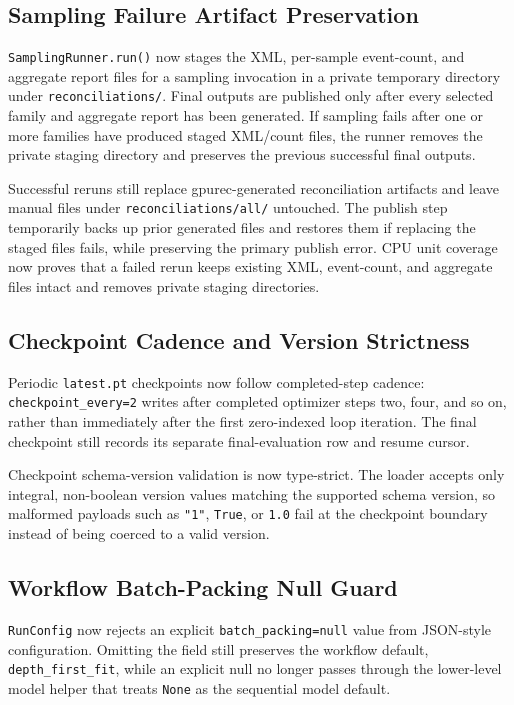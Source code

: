 \documentclass[11pt]{article}
\begin{document}
\subsection{Sampling Failure Artifact Preservation}

\texttt{SamplingRunner.run()} now stages the XML, per-sample event-count, and
aggregate report files for a sampling invocation in a private temporary
directory under \texttt{reconciliations/}.  Final outputs are published only
after every selected family and aggregate report has been generated.  If
sampling fails after one or more families have produced staged XML/count files,
the runner removes the private staging directory and preserves the previous
successful final outputs.

Successful reruns still replace gpurec-generated reconciliation artifacts and
leave manual files under \texttt{reconciliations/all/} untouched.  The publish
step temporarily backs up prior generated files and restores them if replacing
the staged files fails, while preserving the primary publish error.  CPU unit
coverage now proves that a failed rerun keeps existing XML, event-count, and
aggregate files intact and removes private staging directories.

\subsection{Checkpoint Cadence and Version Strictness}

Periodic \texttt{latest.pt} checkpoints now follow completed-step cadence:
\texttt{checkpoint\_every=2} writes after completed optimizer steps two, four,
and so on, rather than immediately after the first zero-indexed loop
iteration.  The final checkpoint still records its separate final-evaluation
row and resume cursor.

Checkpoint schema-version validation is now type-strict.  The loader accepts
only integral, non-boolean version values matching the supported schema
version, so malformed payloads such as \texttt{"1"}, \texttt{True}, or
\texttt{1.0} fail at the checkpoint boundary instead of being coerced to a
valid version.

\subsection{Workflow Batch-Packing Null Guard}

\texttt{RunConfig} now rejects an explicit \texttt{batch\_packing=null} value
from JSON-style configuration.  Omitting the field still preserves the
workflow default, \texttt{depth\_first\_fit}, while an explicit null no longer
passes through the lower-level model helper that treats \texttt{None} as the
sequential model default.
\end{document}

